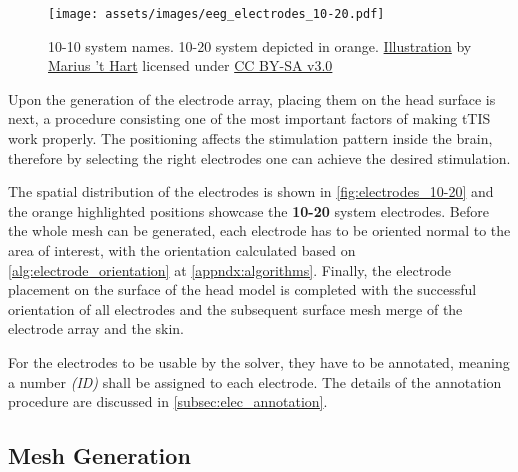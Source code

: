 \begin{wrapfigure}{l}{0.48\textwidth}
    \centering
    \vspace{-15pt}
    \texttt{[image: assets/images/eeg\_electrodes\_10-20.pdf]}
    \caption[10-10 system names. The orange electrodes are used in the 10-20 system.]{10-10 system names. 10-20 system depicted in orange. \href{http://www.mariusthart.net/downloads/eeg_electrodes_10-20.svg}{Illustration} by \href{http://www.beteredingen.nl}{Marius 't Hart} licensed under \href{http://creativecommons.org/licenses/by-sa/3.0/nl/deed.en_GB}{CC BY-SA v3.0}}
    \label{fig:electrodes_10-20}
\end{wrapfigure}

Upon the generation of the electrode array, placing them on the head surface is next, a procedure consisting one of the most important factors of making \gls{tTIS} work properly. The positioning affects the stimulation pattern inside the brain, therefore by selecting the right electrodes one can achieve the desired stimulation.

The spatial distribution of the electrodes is shown in \autoref{fig:electrodes_10-20} and the orange highlighted positions showcase the \textbf{10-20} system electrodes. Before the whole mesh can be generated, each electrode has to be oriented normal to the area of interest, with the orientation calculated based on \autoref{alg:electrode_orientation} at \autoref{appndx:algorithms}. Finally, the electrode placement on the surface of the head model is completed with the successful orientation of all electrodes and the subsequent surface mesh merge of the electrode array and the skin.

For the electrodes to be usable by the solver, they have to be annotated, meaning a number \textit{(ID)} shall be assigned to each electrode. The details of the annotation procedure are discussed in \ref{subsec:elec_annotation}.

\subsection{Mesh Generation}
\label{subsec:mesh_generation}

